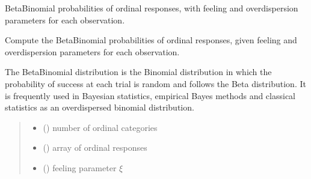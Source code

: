 \documentclass[letterpaper,10pt,english]{sphinxmanual}
\begin{document}
\begin{fulllineitems}
\begin{quote}
\begin{description}
\begin{itemize}
\end{itemize}

\end{description}\end{quote}

\end{fulllineitems}


\begin{fulllineitems}
\label{\detokenize{cubmods:cubmods.cube_ywz.betabinomial}}
\pysigstartsignatures
{}
\pysigstopsignatures
\sphinxAtStartPar
Beta\sphinxhyphen{}Binomial probabilities of ordinal responses, with feeling and overdispersion parameters
for each observation.

\sphinxAtStartPar
Compute the Beta\sphinxhyphen{}Binomial probabilities of ordinal responses, given feeling and overdispersion
parameters for each observation.

\sphinxAtStartPar
The Beta\sphinxhyphen{}Binomial distribution is the Binomial distribution in which the probability of success at
each trial is random and follows the Beta distribution. It is frequently used in Bayesian 
statistics, empirical Bayes methods and classical statistics as an overdispersed binomial distribution.
\begin{quote}\begin{description}
\begin{itemize}
\item {} 
\sphinxAtStartPar
{} () \textendash{} number of ordinal categories

\item {} 
\sphinxAtStartPar
{} () \textendash{} array of ordinal responses

\item {} 
\sphinxAtStartPar
{} () \textendash{} feeling parameter \(\xi\)


\end{itemize}
\end{description}
\end{quote}
\end{fulllineitems}
\end{document}
